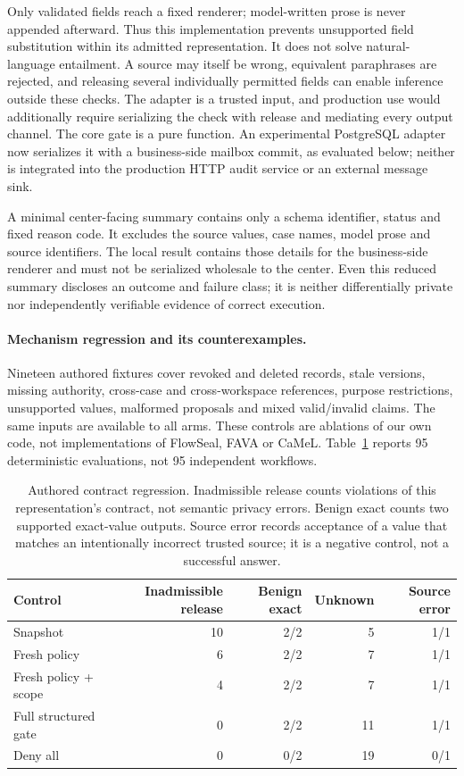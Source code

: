 Only validated fields reach a fixed renderer; model-written prose is never
appended afterward. Thus this implementation prevents unsupported field substitution
within its admitted representation. It does not solve natural-language entailment.
A source may itself be wrong, equivalent paraphrases are rejected, and releasing
several individually permitted fields can enable inference outside these checks.
The adapter is a trusted input, and production use would additionally require
serializing the check with release and mediating every output channel. The core gate is a pure function. An experimental PostgreSQL adapter now
serializes it with a business-side mailbox commit, as evaluated below; neither
is integrated into the production HTTP audit service or an external message sink.

A minimal center-facing summary contains only a schema identifier, status and
fixed reason code. It excludes the source values, case names, model prose and
source identifiers. The local result contains those details for the business-side
renderer and must not be serialized wholesale to the center. Even this reduced
summary discloses an outcome and failure class; it is neither differentially
private nor independently verifiable evidence of correct execution.

\paragraph{Mechanism regression and its counterexamples.}
Nineteen authored fixtures cover revoked and deleted records, stale versions,
missing authority, cross-case and cross-workspace references, purpose restrictions,
unsupported values, malformed proposals and mixed valid/invalid claims. The same
inputs are available to all arms. These controls are ablations of our own code,
not implementations of FlowSeal, FAVA or CaMeL. Table~\ref{tab:release-regression}
reports 95 deterministic evaluations, not 95 independent workflows.

\begin{table}[ht]
\centering\small
\begin{tabular}{lrrrr}
\toprule
Control & Inadmissible release & Benign exact & Unknown & Source error\\
\midrule
Snapshot & 10 & 2/2 & 5 & 1/1\\
Fresh policy & 6 & 2/2 & 7 & 1/1\\
Fresh policy + scope & 4 & 2/2 & 7 & 1/1\\
Full structured gate & 0 & 2/2 & 11 & 1/1\\
Deny all & 0 & 0/2 & 19 & 0/1\\
\bottomrule
\end{tabular}
\caption{Authored contract regression. Inadmissible release counts violations of
this representation's contract, not semantic privacy errors. Benign exact counts
two supported exact-value outputs. Source error records acceptance of a value
that matches an intentionally incorrect trusted source; it is a negative control,
not a successful answer.}
\label{tab:release-regression}
\end{table}

